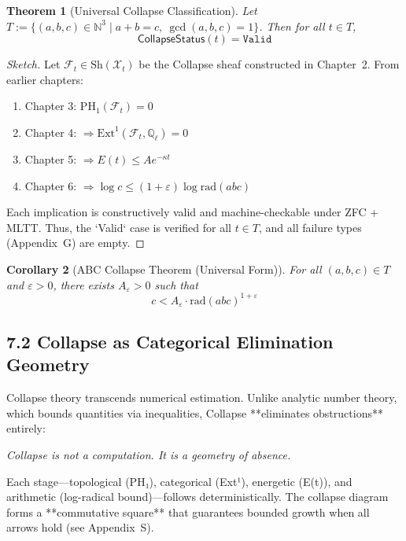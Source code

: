 \documentclass[11pt]{article}
\newtheorem{theorem}{Theorem}[section]
\newtheorem{corollary}[theorem]{Corollary}
\begin{document}
\begin{theorem}[Universal Collapse Classification]
Let \( T := \{ (a,b,c) \in \mathbb{N}^3 \mid a+b=c,\ \gcd(a,b,c)=1 \} \). Then for all \( t \in T \),
\[
\mathsf{CollapseStatus}(t) = \texttt{Valid}
\]
\end{theorem}

\begin{proof}[Sketch]
Let \( \mathcal{F}_t \in \mathrm{Sh}(\mathcal{X}_t) \) be the Collapse sheaf constructed in Chapter~2.  
From earlier chapters:
\begin{enumerate}
  \item Chapter 3: \( \mathrm{PH}_1(\mathcal{F}_t) = 0 \)
  \item Chapter 4: \( \Rightarrow \mathrm{Ext}^1(\mathcal{F}_t, \mathbb{Q}_\ell) = 0 \)
  \item Chapter 5: \( \Rightarrow E(t) \leq A e^{-\kappa t} \)
  \item Chapter 6: \( \Rightarrow \log c \leq (1+\varepsilon) \log \mathrm{rad}(abc) \)
\end{enumerate}
Each implication is constructively valid and machine-checkable under ZFC + MLTT. Thus, the `Valid` case is verified for all \( t \in T \), and all failure types (Appendix~G) are empty.
\end{proof}

\begin{corollary}[ABC Collapse Theorem (Universal Form)]
For all \( (a,b,c) \in T \) and \( \varepsilon > 0 \), there exists \( A_\varepsilon > 0 \) such that
\[
c < A_\varepsilon \cdot \mathrm{rad}(abc)^{1+\varepsilon}
\]
\end{corollary}

\subsection{7.2 Collapse as Categorical Elimination Geometry}

Collapse theory transcends numerical estimation. Unlike analytic number theory, which bounds quantities via inequalities, Collapse **eliminates obstructions** entirely:

\begin{center}
\textit{Collapse is not a computation. It is a geometry of absence.}
\end{center}

Each stage—topological (PH₁), categorical (Ext¹), energetic (E(t)), and arithmetic (log-radical bound)—follows deterministically. The collapse diagram forms a **commutative square** that guarantees bounded growth when all arrows hold (see Appendix~S).
\end{document}
